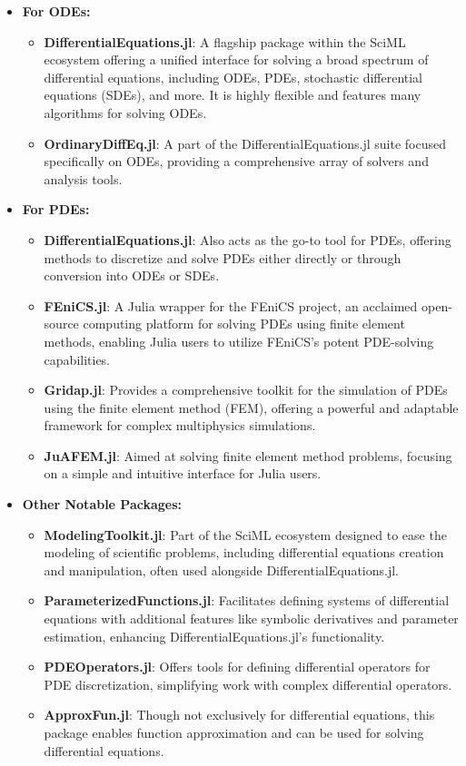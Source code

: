 \begin{itemize}
  \item \textbf{For ODEs:}
  \begin{itemize}
    \item \textbf{DifferentialEquations.jl}: A flagship package within the SciML ecosystem offering a unified interface for solving a broad spectrum of differential equations, including ODEs, PDEs, stochastic differential equations (SDEs), and more. It is highly flexible and features many algorithms for solving ODEs.
    \item \textbf{OrdinaryDiffEq.jl}: A part of the DifferentialEquations.jl suite focused specifically on ODEs, providing a comprehensive array of solvers and analysis tools.
  \end{itemize}

  \item \textbf{For PDEs:}
  \begin{itemize}
    \item \textbf{DifferentialEquations.jl}: Also acts as the go-to tool for PDEs, offering methods to discretize and solve PDEs either directly or through conversion into ODEs or SDEs.
    \item \textbf{FEniCS.jl}: A Julia wrapper for the FEniCS project, an acclaimed open-source computing platform for solving PDEs using finite element methods, enabling Julia users to utilize FEniCS's potent PDE-solving capabilities.
    \item \textbf{Gridap.jl}: Provides a comprehensive toolkit for the simulation of PDEs using the finite element method (FEM), offering a powerful and adaptable framework for complex multiphysics simulations.
    \item \textbf{JuAFEM.jl}: Aimed at solving finite element method problems, focusing on a simple and intuitive interface for Julia users.
  \end{itemize}

  \item \textbf{Other Notable Packages:}
  \begin{itemize}
    \item \textbf{ModelingToolkit.jl}: Part of the SciML ecosystem designed to ease the modeling of scientific problems, including differential equations creation and manipulation, often used alongside DifferentialEquations.jl.
    \item \textbf{ParameterizedFunctions.jl}: Facilitates defining systems of differential equations with additional features like symbolic derivatives and parameter estimation, enhancing DifferentialEquations.jl's functionality.
    \item \textbf{PDEOperators.jl}: Offers tools for defining differential operators for PDE discretization, simplifying work with complex differential operators.
    \item \textbf{ApproxFun.jl}: Though not exclusively for differential equations, this package enables function approximation and can be used for solving differential equations.
  \end{itemize}
\end{itemize}

